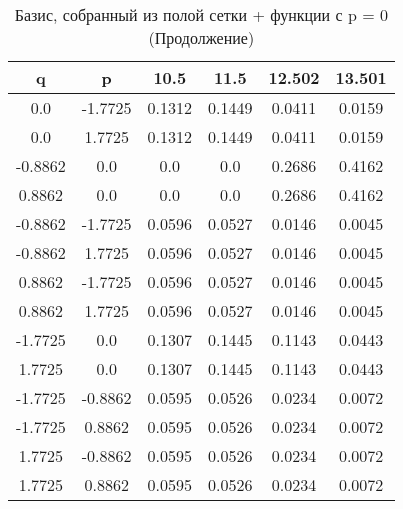 \documentclass[a4paper,14pt]{extarticle}
\begin{document}
\begin{landscape}
\begin{table}[H]
\centering
\caption{Базис, собранный из полой сетки + функции с p = 0 (Продолжение)}
\begin{tabular}{|c|c|*{4}{c}|}
\hline
q       & p       & 10.5   & 11.5   & 12.502 & 13.501  \\ 
\hline                                                
0.0     & -1.7725 & 0.1312 & 0.1449 & 0.0411 & 0.0159  \\ 
0.0     & 1.7725  & 0.1312 & 0.1449 & 0.0411 & 0.0159  \\ 
-0.8862 & 0.0     & 0.0    & 0.0    & 0.2686 & 0.4162  \\ 
0.8862  & 0.0     & 0.0    & 0.0    & 0.2686 & 0.4162  \\ 
-0.8862 & -1.7725 & 0.0596 & 0.0527 & 0.0146 & 0.0045  \\ 
-0.8862 & 1.7725  & 0.0596 & 0.0527 & 0.0146 & 0.0045  \\ 
0.8862  & -1.7725 & 0.0596 & 0.0527 & 0.0146 & 0.0045  \\ 
0.8862  & 1.7725  & 0.0596 & 0.0527 & 0.0146 & 0.0045  \\ 
-1.7725 & 0.0     & 0.1307 & 0.1445 & 0.1143 & 0.0443  \\ 
1.7725  & 0.0     & 0.1307 & 0.1445 & 0.1143 & 0.0443  \\ 
-1.7725 & -0.8862 & 0.0595 & 0.0526 & 0.0234 & 0.0072  \\ 
-1.7725 & 0.8862  & 0.0595 & 0.0526 & 0.0234 & 0.0072  \\ 
1.7725  & -0.8862 & 0.0595 & 0.0526 & 0.0234 & 0.0072  \\ 
1.7725  & 0.8862  & 0.0595 & 0.0526 & 0.0234 & 0.0072  \\ 
\hline
\end{tabular}
\end{table} 


\end{landscape}
\end{document}
